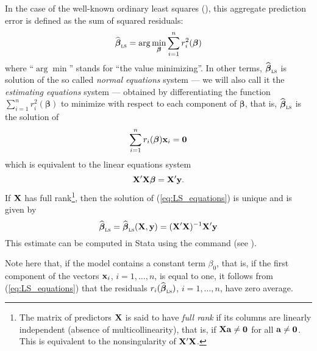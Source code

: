 In the case of the well-known ordinary least squares (), this
aggregate prediction error is defined as the sum of squared residuals:
%
\begin{equation}\label{eq:LS_min}
    \sthat{\boldsymbol\beta}_{\stsc{LS}} = \arg\min_{\boldsymbol\beta} 
    \sum_{i=1}^{n} r_{i}^{2}(\boldsymbol\beta)
\end{equation}
%
where “$\arg\min$” stands for “the value minimizing”. In other terms,
$\sthat{\boldsymbol\beta}_{\stsc{LS}}$ is solution of the so called
\emph{normal equations} system --- we will also call it the \emph{estimating
equations} system --- obtained by differentiating the function $\sum_{i=1}^{n}
r_{i}^{2}(\boldsymbol\beta)$ to minimize with respect to each component of
$\boldsymbol\beta$, that is, $\sthat{\boldsymbol\beta}_{\stsc{LS}}$ is the
solution of
%
\begin{equation}\label{eq:LS_equations}
    \sum_{i=1}^{n}  r_{i}(\boldsymbol\beta)\mathbf x_{i} = \mathbf 0
\end{equation}
%
which is equivalent to the linear equations system
\[
    \mathbf X'\mathbf X\boldsymbol\beta = \mathbf X'\mathbf y.
\]
If $\mathbf X$ has full rank\footnote{The matrix of predictors $\mathbf X$ is
said to have \emph{full rank} if its columns are linearly independent (absence
of multicollinearity), that is, if $\mathbf X\mathbf a\neq\mathbf 0$ for all
$\mathbf a\neq\mathbf 0$. This is equivalent to the nonsingularity of
$\mathbf X'\mathbf X$.}, then the solution of (\ref{eq:LS_equations}) is unique
and is given by
%
\begin{equation}\label{eq:LS_estimator}
    \sthat{\boldsymbol\beta}_{\stsc{LS}}
    = \sthat{\boldsymbol\beta}_{\stsc{LS}}(\stmat{X}, \stvec{y})
    = (\stmat{X}'\stmat{X})^{-1} \stmat{X}'\stvec{y}
\end{equation}
%
This estimate can be computed in Stata using the  command (see
).

Note here that, if the model contains a constant term $\beta_{0}$, that is, if
the first component of the vectors $\mathbf x_{i}$, $i = 1, \dots, n$, is equal
to one, it follows from (\ref{eq:LS_equations}) that the residuals
$r_{i}(\sthat{\boldsymbol\beta}_{\stsc{LS}})$, $i = 1, \dots, n$, have zero
average.

